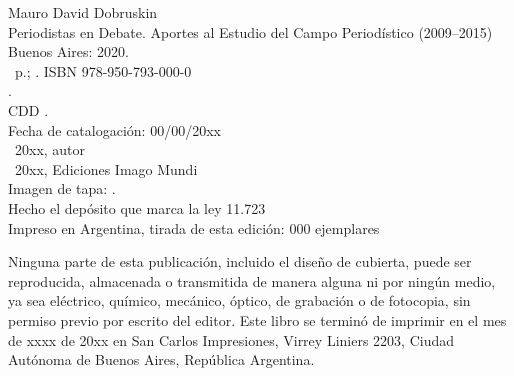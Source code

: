 \noindent Mauro David Dobruskin \\
\noindent Periodistas en Debate. Aportes al Estudio del Campo Periodístico (2009--2015) Buenos Aires: 2020.\\
\noindent \ztotpages\ p.; \valorEspecifico. ISBN 978-950-793-000-0 \\
. \\
\noindent CDD .\\
\noindent Fecha de catalogación: 00/00/20xx \\
\noindent \textcopyright~20xx, autor \\
\noindent \textcopyright~20xx, Ediciones Imago Mundi\\
\noindent Imagen de tapa: .\\
\noindent Hecho el depósito que marca la ley 11.723\\
\noindent Impreso en Argentina, tirada de esta edición: 000 ejemplares\\

\vfill

\noindent {}\bigskip

\noindent Ninguna parte de esta publicación, incluido el diseño de cubierta, puede ser reproducida, almacenada o transmitida de manera alguna ni por ningún medio, ya sea eléctrico, químico, mecánico, óptico, de grabación o de fotocopia, sin permiso previo por escrito del editor. Este libro se terminó de imprimir en el mes de xxxx de 20xx en San Carlos Impresiones, Virrey Liniers 2203, Ciudad Autónoma de Buenos Aires, República Argentina.

